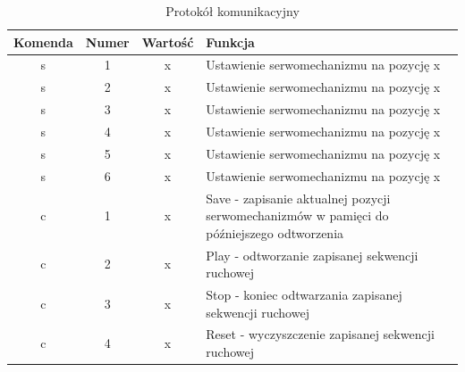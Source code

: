 \documentclass[11pt,titlepage,a4paper]{article}
\begin{document}
\begin{table}[h!]
    \begin{center}
        \begin{tabular}{|c|c|c|m{8cm}|}
            \hline
            Komenda & Numer & Wartość & Funkcja                                                                                   \\
            \hline
            s       & 1     & x       & Ustawienie serwomechanizmu na pozycję x                                                   \\
            \hline
            s       & 2     & x       & Ustawienie serwomechanizmu na pozycję x                                                   \\
            \hline
            s       & 3     & x       & Ustawienie serwomechanizmu na pozycję x                                                   \\
            \hline
            s       & 4     & x       & Ustawienie serwomechanizmu na pozycję x                                                   \\
            \hline
            s       & 5     & x       & Ustawienie serwomechanizmu na pozycję x                                                   \\
            \hline
            s       & 6     & x       & Ustawienie serwomechanizmu na pozycję x                                                   \\
            \hline
            c       & 1     & x       & Save - zapisanie aktualnej pozycji serwomechanizmów w pamięci do późniejszego odtworzenia \\
            \hline
            c       & 2     & x       & Play - odtworzanie zapisanej sekwencji ruchowej                                           \\
            \hline
            c       & 3     & x       & Stop - koniec odtwarzania zapisanej sekwencji ruchowej                                    \\
            \hline
            c       & 4     & x       & Reset - wyczyszczenie zapisanej sekwencji ruchowej                                        \\
            \hline
        \end{tabular}
    \end{center}
    \caption{Protokół komunikacyjny}
    \label{Komunikacja}
\end{table}
\end{document}
